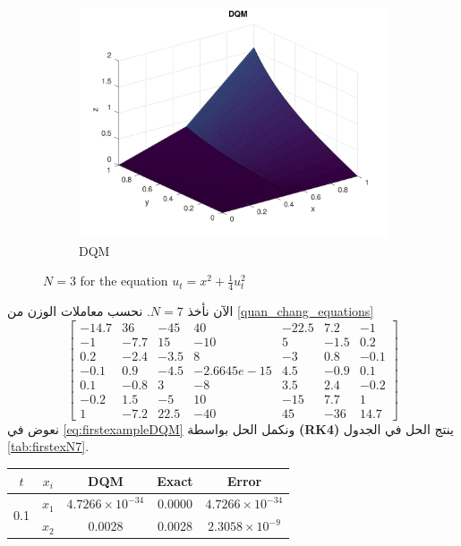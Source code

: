 \begin{solution}
\begin{english}
\begin{figure}[ht]
\begin{subfigure}{0.3\textwidth}
			\includegraphics[scale=0.05]{Figures/firstN3}
			\caption{DQM}
		\end{subfigure}
		\caption{$N=3$ for the equation $u_t = x^2 + \frac{1}{4} u_t^2$}
		\label{fig:firstexampleN3}
	\end{figure}
\end{english}
الآن نأخذ $N=7$. نحسب معاملات الوزن من \eqref{quan_chang_equations}  
\[
\begin{bmatrix}
	-14.7 & 36 & -45 & 40 & -22.5 & 7.2 & -1 \\
	-1 & -7.7 & 15 & -10 & 5 & -1.5 & 0.2 \\
	0.2 & -2.4 & -3.5 & 8 & -3 & 0.8 & -0.1 \\
	-0.1 & 0.9 & -4.5 & -2.6645e-15 & 4.5 & -0.9 & 0.1 \\
	0.1 & -0.8 & 3 & -8 & 3.5 & 2.4 & -0.2 \\
	-0.2 & 1.5 & -5 & 10 & -15 & 7.7 & 1 \\
	1 & -7.2 & 22.5 & -40 & 45 & -36 & 14.7
\end{bmatrix}
\]
نعوض في \eqref{eq:firstexampleDQM} ونكمل الحل بواسطة \textbf{(RK4)} ينتج الحل في الجدول \ref{tab:firstexN7}.
\begin{english}
	\begin{table}[ht]
		\centering
		\begin{tabular}{|c|c|c|c|c|}
			\hline
			$t$ & $x_i$ & DQM & Exact & Error \\
			\hline
			\multirow{7}{*}{0.1} & $x_1$ & $4.7266 \times 10^{-34}$ & 0.0000 & $4.7266 \times 10^{-34}$ \\
			& $x_2$ & 0.0028 & 0.0028 & $2.3058 \times 10^{-9}$ \\

\end{tabular}
\end{table}
\end{english}
\end{solution}
